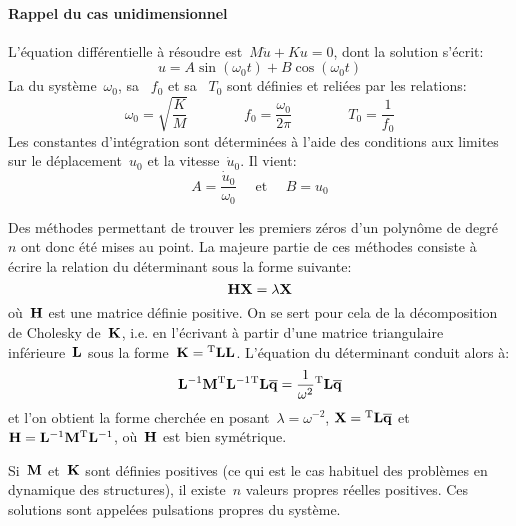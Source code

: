 \paragraph{Rappel du cas unidimensionnel}
L'équation différentielle à résoudre est~$M\ddot{u}+Ku=0$, dont la solution s'écrit: \begin{equation} u=A\sin (\omega_0 t)+B\cos(\omega_0 t) \end{equation}
La  du système~$\omega_0$, sa ~$f_0$ et sa ~$T_0$ sont définies et reliées par les relations:
\begin{equation}
\omega_0=\sqrt{\dfrac{K}M} \qquad\qquad f_0=\dfrac{\omega_0}{2\pi} \qquad\qquad T_0=\dfrac1{f_0}
\end{equation}
Les constantes d'intégration sont déterminées à l'aide des conditions aux limites sur le déplacement~$u_0$ et la
vitesse~$\dot{u}_0$. Il vient: \begin{equation} A=\frac{\dot{u}_0}{\omega_0} \quad\text{ et }\quad B=u_0\end{equation}

\medskip{}
Des méthodes permettant de trouver les premiers zéros d'un polynôme de degré~$n$ ont donc été mises au point. La majeure partie de ces méthodes consiste à écrire la relation du déterminant sous la forme suivante:
\begin{equation} \MM{H}\VV{X}=\lambda\VV{X} \end{equation}
où~$\MM{H}$ est une matrice définie positive.
\medskipvm
On se sert pour cela de la décomposition de Cholesky de~$\MM{K}$, i.e. en l'écrivant à partir d'une matrice triangulaire inférieure~$\MM{L}$ sous la forme~$\MM{K}=\MMT{L}\MM{L}$.
\medskipvm
L'équation du déterminant conduit alors à:
\begin{equation} \MMI{L}\MM{M}\MMIT{L}\MMT{L}\VV{\overline{q}}=\frac1{\omega^2}\MMT{L}\VV{\overline{q}} \end{equation}
et l'on obtient la forme cherchée en posant~$\lambda=\omega^{-2}$, $\VV{X}=\MMT{L}\VV{\overline{q}}$
et~$\MM{H}=\MMI{L}\MM{M}\MMIT{L}$, où~$\MM{H}$ est bien symétrique.

\medskip
{}
Si~$\MM{M}$ et~$\MM{K}$ sont définies positives (ce qui est le cas habituel des problèmes en dynamique des structures), il existe~$n$ valeurs propres réelles positives. Ces solutions sont appelées pulsations propres du système.

